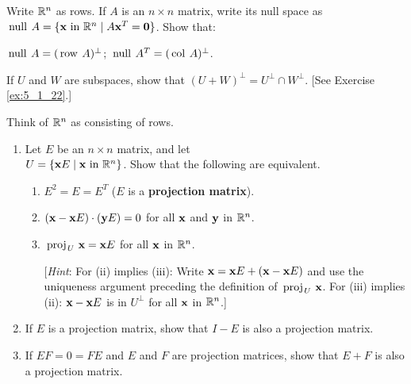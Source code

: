 \begin{multicols}{2}
\begin{ex}
Write $\mathbb{R}^n$ as rows. If $A$ is an $n \times n$ matrix, write its null space as $\thinspace\operatorname{null \medspace}A = \{\textbf{x} \mbox{ in } \mathbb{R}^n \mid A\textbf{x}^{T} = \textbf{0}\}$. Show that:

\begin{exenumerate}
\exitem $\thinspace\operatorname{null \medspace}A = (\thinspace\operatorname{row \medspace}A)^\perp$;
\exitem $\thinspace\operatorname{null \medspace}A^{T} = (\thinspace\operatorname{col \medspace}A)^\perp$.
\end{exenumerate}
\end{ex}

\begin{ex}
If $U$ and $W$ are subspaces, show that $(U + W)^\perp = U^\perp \cap W^\perp$. [See Exercise \ref{ex:5_1_22}.]
\end{ex}

\begin{ex}\label{ex:8_1_17}
Think of $\mathbb{R}^n$ as consisting of rows.

\begin{enumerate}[label={\alph*.}]
\item Let $E$ be an $n \times n$ matrix, and let \\ $U = \{\textbf{x} E \mid \textbf{x} \mbox{ in } \mathbb{R}^n\}$. Show that the following are equivalent.


\begin{enumerate}[label={\roman*.}]
\item $E^{2} = E = E^{T}$ ($E$ is a \textbf{projection matrix}).

\item $(\textbf{x} - \textbf{x}E) \cdot (\textbf{y}E) = 0$ for all $\textbf{x}$ and $\textbf{y}$ in $\mathbb{R}^n$.

\item $\thinspace\operatorname{proj\medspace}_{\!U}\,{\textbf{x}} = \textbf{x}E$ for all $\textbf{x}$ in $\mathbb{R}^n$.


[\textit{Hint}: For (ii) implies (iii): Write $\textbf{x} = \textbf{x}E + (\textbf{x} - \textbf{x}E)$ and use the uniqueness argument preceding the definition of $\thinspace\operatorname{proj\medspace}_{\!U}\,{\textbf{x}}$. For (iii) implies (ii): $\textbf{x} - \textbf{x}E$ is in $U^\perp$ for all $\textbf{x}$ in $\mathbb{R}^n$.]

\end{enumerate}
\item If $E$ is a projection matrix, show that $I - E$ is also a projection matrix.

\item If $EF = 0 = FE$ and $E$ and $F$ are projection matrices, show that $E + F$ is also a projection matrix.


\end{enumerate}
\end{ex}
\end{multicols}
